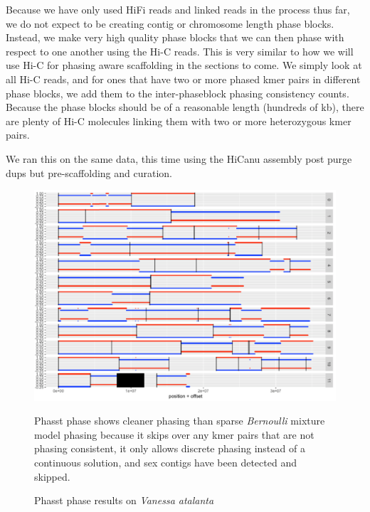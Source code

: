 {\par{
Because we have only used HiFi reads and linked reads in the process thus far, we do not expect to be creating contig or chromosome length phase blocks. Instead, we make very high quality phase blocks that we can then phase with respect to one another using the Hi-C reads. This is very similar to how we will use Hi-C for phasing aware scaffolding in the sections to come. We simply look at all Hi-C reads, and for ones that have two or more phased kmer pairs in different phase blocks, we add them to the inter-phaseblock phasing consistency counts. Because the phase blocks should be of a reasonable length (hundreds of kb), there are plenty of Hi-C molecules linking them with two or more heterozygous kmer pairs.
} \\

\par{
We ran this on the same data, this time using the HiCanu assembly post purge dups but pre-scaffolding and curation.
}


\begin{figure}[htbp!]
\caption{Phasst phase results on \textit{Vanessa atalanta}}
\label{figure:phasstphase}
\begin{centering}
\includegraphics[width=\textwidth]{phasstphase.png}
\par{Phasst phase shows cleaner phasing than sparse \textit{Bernoulli} mixture model phasing because it skips over any kmer pairs that are not phasing consistent, it only allows discrete phasing instead of a continuous solution, and sex contigs have been detected and skipped. }
\end{centering}
\end{figure}

}
